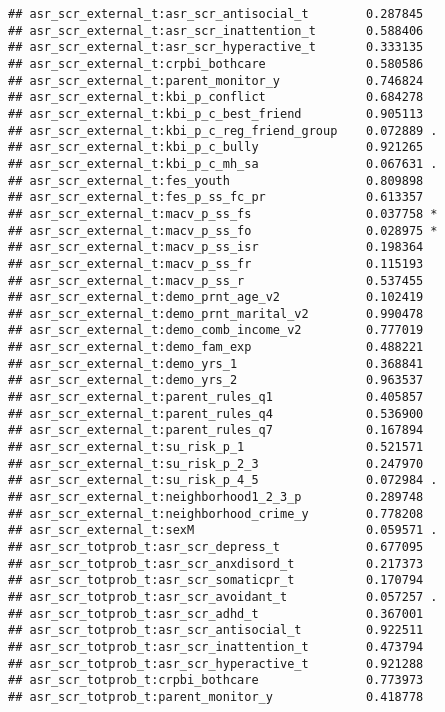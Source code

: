 \documentclass[
]{article}
\begin{document}
\begin{verbatim}
## asr_scr_external_t:asr_scr_antisocial_t        0.287845    
## asr_scr_external_t:asr_scr_inattention_t       0.588406    
## asr_scr_external_t:asr_scr_hyperactive_t       0.333135    
## asr_scr_external_t:crpbi_bothcare              0.580586    
## asr_scr_external_t:parent_monitor_y            0.746824    
## asr_scr_external_t:kbi_p_conflict              0.684278    
## asr_scr_external_t:kbi_p_c_best_friend         0.905113    
## asr_scr_external_t:kbi_p_c_reg_friend_group    0.072889 .  
## asr_scr_external_t:kbi_p_c_bully               0.921265    
## asr_scr_external_t:kbi_p_c_mh_sa               0.067631 .  
## asr_scr_external_t:fes_youth                   0.809898    
## asr_scr_external_t:fes_p_ss_fc_pr              0.613357    
## asr_scr_external_t:macv_p_ss_fs                0.037758 *  
## asr_scr_external_t:macv_p_ss_fo                0.028975 *  
## asr_scr_external_t:macv_p_ss_isr               0.198364    
## asr_scr_external_t:macv_p_ss_fr                0.115193    
## asr_scr_external_t:macv_p_ss_r                 0.537455    
## asr_scr_external_t:demo_prnt_age_v2            0.102419    
## asr_scr_external_t:demo_prnt_marital_v2        0.990478    
## asr_scr_external_t:demo_comb_income_v2         0.777019    
## asr_scr_external_t:demo_fam_exp                0.488221    
## asr_scr_external_t:demo_yrs_1                  0.368841    
## asr_scr_external_t:demo_yrs_2                  0.963537    
## asr_scr_external_t:parent_rules_q1             0.405857    
## asr_scr_external_t:parent_rules_q4             0.536900    
## asr_scr_external_t:parent_rules_q7             0.167894    
## asr_scr_external_t:su_risk_p_1                 0.521571    
## asr_scr_external_t:su_risk_p_2_3               0.247970    
## asr_scr_external_t:su_risk_p_4_5               0.072984 .  
## asr_scr_external_t:neighborhood1_2_3_p         0.289748    
## asr_scr_external_t:neighborhood_crime_y        0.778208    
## asr_scr_external_t:sexM                        0.059571 .  
## asr_scr_totprob_t:asr_scr_depress_t            0.677095    
## asr_scr_totprob_t:asr_scr_anxdisord_t          0.217373    
## asr_scr_totprob_t:asr_scr_somaticpr_t          0.170794    
## asr_scr_totprob_t:asr_scr_avoidant_t           0.057257 .  
## asr_scr_totprob_t:asr_scr_adhd_t               0.367001    
## asr_scr_totprob_t:asr_scr_antisocial_t         0.922511    
## asr_scr_totprob_t:asr_scr_inattention_t        0.473794    
## asr_scr_totprob_t:asr_scr_hyperactive_t        0.921288    
## asr_scr_totprob_t:crpbi_bothcare               0.773973    
## asr_scr_totprob_t:parent_monitor_y             0.418778    

\end{verbatim}
\end{document}
